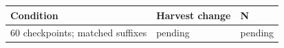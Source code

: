 \begin{tabular}{lll}
Condition & Harvest change & N \\
\hline
60 checkpoints; matched suffixes & pending & pending \\
\end{tabular}
